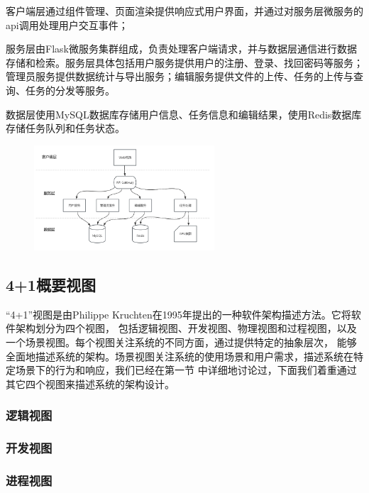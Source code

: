 客户端层通过组件管理、页面渲染提供响应式用户界面，并通过对服务层微服务的api调用处理用户交互事件；

服务层由Flask微服务集群组成，负责处理客户端请求，并与数据层通信进行数据存储和检索。服务层具体包括用户服务提供用户的注册、登录、找回密码等服务；
管理员服务提供数据统计与导出服务；编辑服务提供文件的上传、任务的上传与查询、任务的分发等服务。

数据层使用MySQL数据库存储用户信息、任务信息和编辑结果，使用Redis数据库存储任务队列和任务状态。

\begin{figure}[ht]
    \centering
    \includegraphics[width=0.6\textwidth]{source/img/system_structure.png}
    \label{fig:system_structure}
\end{figure}

\subsection{4+1概要视图}

“4+1”视图是由Philippe Kruchten在1995年提出的一种软件架构描述方法。它将软件架构划分为四个视图，
包括逻辑视图、开发视图、物理视图和过程视图，以及一个场景视图。每个视图关注系统的不同方面，通过提供特定的抽象层次，
能够全面地描述系统的架构。场景视图关注系统的使用场景和用户需求，描述系统在特定场景下的行为和响应，我们已经在第一节
中详细地讨论过，下面我们着重通过其它四个视图来描述系统的架构设计。

\subsubsection{逻辑视图}

\subsubsection{开发视图}

\subsubsection{进程视图}

